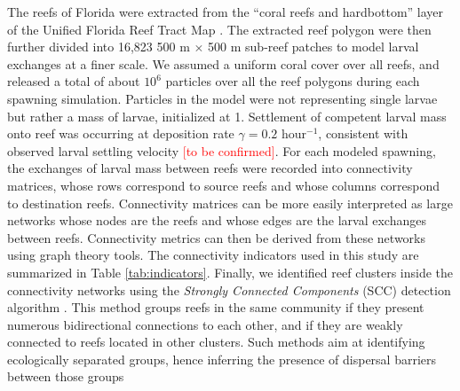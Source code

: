 \documentclass[fleqn,10pt]{wlscirep}
\begin{document}
The reefs of Florida were extracted from the “coral reefs and hardbottom” layer of the Unified Florida Reef Tract Map \citep{fwc2017unified}. The extracted reef polygon were then further divided into 16,823 500 m $\times$ 500 m sub-reef patches to model larval exchanges at a finer scale. We assumed a uniform coral cover over all reefs, and released a total of about $10^6$ particles over all the reef polygons during each spawning simulation. Particles in the model were not representing single larvae but rather a mass of larvae, initialized at 1. Settlement of competent larval mass onto reef was occurring at deposition rate $\gamma = 0.2$ hour$^{-1}$, consistent with observed larval settling velocity \textcolor{red}{[to be confirmed]}. For each modeled spawning, the exchanges of larval mass between reefs were recorded into connectivity matrices, whose rows correspond to source reefs and whose columns correspond to destination reefs. Connectivity matrices can be more easily interpreted as large networks whose nodes are the reefs and whose edges are the larval exchanges between reefs. Connectivity metrics can then be derived from these networks using graph theory tools. The connectivity indicators used in this study are summarized in Table \ref{tab:indicators}. Finally, we identified reef clusters inside the connectivity networks using the \textit{Strongly Connected Components} (SCC) detection algorithm \citep{nuutila1994finding}. This method groups reefs in the same community if they present numerous bidirectional connections to each other, and if they are weakly connected to reefs located in other clusters. Such methods aim at identifying ecologically separated groups, hence inferring the presence of dispersal barriers between those groups \citep{thomas2014numerical,saint2023biophysical}
\end{document}
